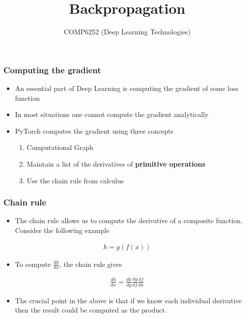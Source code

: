 \documentclass{beamer}
\title{Backpropagation}
\author{COMP6252 (Deep Learning Technologies)}
\institute[ECS, University of Southampton]{ECS, University of Southampton} \date{}
\theoremstyle{plain} %
\theoremstyle{example} %
\begin{document}
\begin{frame}
\placelogofalse %
\titlepage
\end{frame}

\placelogotrue %
\begin{frame}
    \frametitle{Computing the gradient}
\begin{itemize}
    \item An essential part of Deep Learning is computing the gradient of some loss function
    \item In most situations one cannot compute the gradient analytically
    \item PyTorch computes the gradient using three concepts
    \begin{enumerate}
        \item Computational Graph
        \item Maintain a list of the derivatives of \textbf{primitive operations}
        \item Use the chain rule from calculus
    \end{enumerate}
\end{itemize}
    

\end{frame}


\begin{frame}
    \frametitle{Chain rule}
\begin{itemize}
    \item The chain rule allows us to compute the derivative of a composite function. Consider the following example
\end{itemize}
\begin{align*}
    h=g(f(x))
\end{align*}
\begin{itemize}
    \item To  compute $\frac{dh}{dx}$, the chain rule gives
\end{itemize}    
\begin{align*}
    \frac{dh}{dx}=\frac{dh}{dg}\frac{dg}{df}\frac{df}{dx}
\end{align*}
\begin{itemize}
    \item The crucial point in the above is that if we know each individual derivative then the result could be computed as the product.
\end{itemize}
\end{frame}
\end{document}
